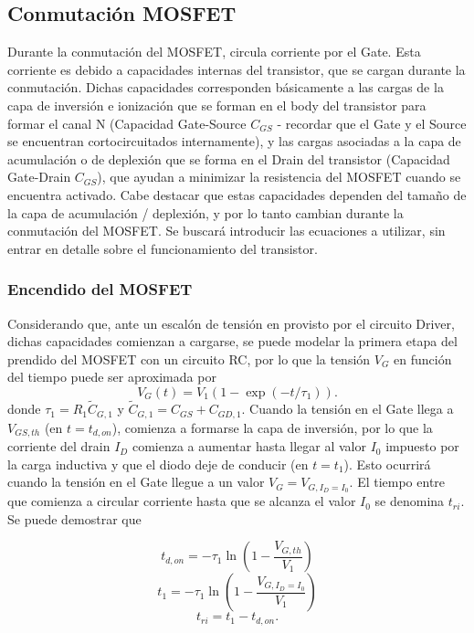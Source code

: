 \documentclass[e4_tp1_main.tex]{subfiles}
\begin{document}
\subsection{Conmutación MOSFET}

Durante la conmutación del MOSFET, circula corriente por el Gate. Esta corriente es debido a capacidades internas del transistor, que se cargan durante la conmutación. Dichas capacidades corresponden básicamente a las cargas de la capa de inversión e ionización que se forman en el body del transistor para formar el canal N (Capacidad Gate-Source $C_{GS}$ - recordar que el Gate y el Source se encuentran cortocircuitados internamente), y las cargas asociadas a la capa de acumulación o de deplexión que se forma en el Drain del transistor (Capacidad Gate-Drain $C_{GS}$), que ayudan a minimizar la resistencia del MOSFET cuando se encuentra activado. Cabe destacar que estas capacidades dependen del tamaño de la capa de acumulación / deplexión, y por lo tanto cambian durante la conmutación del MOSFET. Se buscará introducir las ecuaciones a utilizar, sin entrar en detalle sobre el funcionamiento del transistor.

\subsubsection{Encendido del MOSFET}

Considerando que, ante un escalón de tensión en provisto por el circuito Driver, dichas capacidades comienzan a cargarse, se puede modelar la primera etapa del prendido del MOSFET con un circuito RC, por lo que la tensión $V_{G}$ en función del tiempo puede ser aproximada por
\begin{equation}
V_G(t) = V_1 (1-\exp(-t/\tau_1)).
\end{equation}
donde $\tau_1 = R_1\tilde{C}_{G,1}$ y $\tilde{C}_{G,1} = C_{GS} + C_{GD,1}$. Cuando la tensión en el Gate llega a $V_{GS,th}$ (en $t=t_{d,on}$), comienza a formarse la capa de inversión, por lo que la corriente del drain $I_D$ comienza a aumentar hasta llegar al valor $I_0$ impuesto por la carga inductiva y que el diodo deje de conducir (en $t=t_1$). Esto ocurrirá cuando la tensión en el Gate llegue a un valor $V_G=V_{G,I_D=I_0}$. El tiempo entre que comienza a circular corriente hasta que se alcanza el valor $I_0$ se denomina $t_{ri}$. Se puede demostrar que

\begin{equation}
t_{d,on} = -\tau_1 \ln\left(1-\frac{V_{G,th}}{V_1}\right)
\end{equation}
\begin{equation}
t_{1} = -\tau_1 \ln\left(1-\frac{V_{G,I_D=I_0}}{V_1}\right)
\end{equation}
\begin{equation}
t_{ri} = t_{1} - t_{d,on}.
\end{equation}
\end{document}
